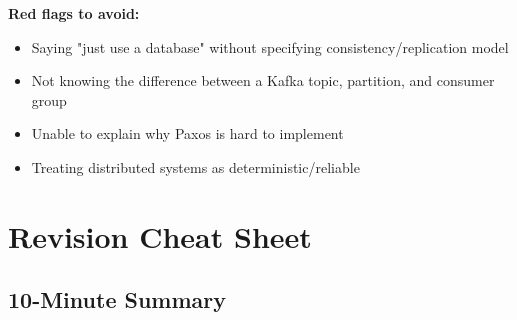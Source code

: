 \documentclass[11pt]{article}
\providecommand{\tightlist}{\setlength{\itemsep}{1pt}\setlength{\parskip}{0pt}}
\begin{document}
\textbf{Red flags to avoid:}

\begin{itemize}
\tightlist
\item
  Saying "just use a database" without specifying consistency/replication model
\item
  Not knowing the difference between a Kafka topic, partition, and consumer group
\item
  Unable to explain why Paxos is hard to implement
\item
  Treating distributed systems as deterministic/reliable
\end{itemize}

\section{Revision Cheat Sheet}\label{revision-cheat-sheet}

\subsection{10-Minute Summary}\label{10-minute-summary}
\end{document}

